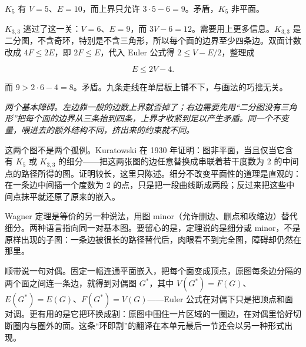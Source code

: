 \(K_5\) 有 \(V=5\)、\(E=10\)，而上界只允许 \(3\cdot 5-6=9\)。矛盾，\(K_5\) 非平面。

\(K_{3,3}\) 逃过了这一关：\(V=6\)、\(E=9\)，而 \(3V-6=12\)。需要用上更多信息。\(K_{3,3}\) 是二分图，不含奇环，特别是不含三角形，所以每个面的边界至少四条边。双面计数改成 \(4F\le 2E\)，即 \(2F\le E\)，代入 Euler 公式得 \(2\le V-E/2\)，整理成

\[
E\le 2V-4.
\]

而 \(9>2\cdot 6-4=8\)。矛盾。九条走线在单层板上铺不下，与画法的巧拙无关。

\begin{center}

\emph{两个基本障碍。左边靠一般的边数上界就否掉了；右边需要先用``二分图没有三角形''把每个面的边界从三条抬到四条，上界才收紧到足以产生矛盾。同一个不变量，喂进去的额外结构不同，挤出来的约束就不同。}
\end{center}

这两个图不是两个孤例。Kuratowski 在 1930 年证明：图非平面，当且仅当它含有 \(K_5\) 或 \(K_{3,3}\) 的细分——把这两张图的边任意替换成串联着若干度数为 2 的中间点的路径所得的图。证明较长，这里只陈述。细分不改变平面性的道理是直观的：在一条边中间插一个度数为 2 的点，只是把一段曲线断成两段；反过来把这些中间点抹平就还原了原来的嵌入。

Wagner 定理是等价的另一种说法，用图 minor（允许删边、删点和收缩边）替代细分。两种语言指向同一对基本图。要留心的是，定理说的是细分或 minor，不是原样出现的子图：一条边被很长的路径替代后，肉眼看不到完全图，障碍却仍然在那里。

顺带说一句对偶。固定一幅连通平面嵌入，把每个面变成顶点，原图每条边分隔的两个面之间连一条边，就得到对偶图 \(G^{*}\)，其中 \(V(G^{*})=F(G)\)、\(E(G^{*})=E(G)\)、\(F(G^{*})=V(G)\)——Euler 公式在对偶下只是把顶点和面对调。更有用的是它把环换成割：原图中围住一片区域的一圈边，在对偶里恰好切断圈内与圈外的面。这条``环即割''的翻译在本单元最后一节还会以另一种形式出现。

